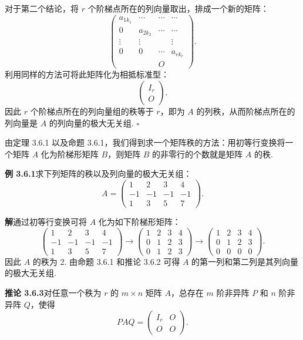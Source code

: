 \documentclass[UTF8, 12pt, fontset=fandol, oneside]{ctexart}
\begin{document}
对于第二个结论，将 $r$ 个阶梯点所在的列向量取出，排成一个新的矩阵：
\[
\left(\begin{array}{cccc}
a_{1k_1}&\cdots&\cdots&\cdots\\
0&a_{2k_2}&\cdots&\cdots\\
\vdots&\vdots&&\vdots\\
0&0&\cdots&a_{rk_r}\\
&&O&
\end{array}\right).
\]
利用同样的方法可将此矩阵化为相抵标准型：
\[
\left(\begin{array}{c}
I_r\\
O
\end{array}\right).
\]
因此 $r$ 个阶梯点所在的列向量组的秩等于 $r$，即为 $A$ 的列秩，从而阶梯点所在的列向量是 $A$ 的列向量的极大无关组. $\square$

由定理 3.6.1 以及命题 3.6.1，我们得到求一个矩阵秩的方法：用初等行变换将一个矩阵 $A$ 化为阶梯形矩阵 $B$，则矩阵 $B$ 的非零行的个数就是矩阵 $A$ 的秩.

\noindent\textbf{例 3.6.1}\quad 求下列矩阵的秩以及列向量的极大无关组：
\[
A=\left(\begin{array}{rrrr}
1&2&3&4\\
-1&-1&-1&-1\\
1&3&5&7
\end{array}\right).
\]

\noindent\textbf{解}\quad 通过初等行变换可将 $A$ 化为如下阶梯形矩阵：
\[
\left(\begin{array}{rrrr}
1&2&3&4\\
-1&-1&-1&-1\\
1&3&5&7
\end{array}\right)
\to
\left(\begin{array}{rrrr}
1&2&3&4\\
0&1&2&3\\
0&1&2&3
\end{array}\right)
\to
\left(\begin{array}{rrrr}
1&2&3&4\\
0&1&2&3\\
0&0&0&0
\end{array}\right).
\]
因此 $A$ 的秩为 2. 由命题 3.6.1 和推论 3.6.2 可得 $A$ 的第一列和第二列是其列向量的极大无关组.

\noindent\textbf{推论 3.6.3}\quad 对任意一个秩为 $r$ 的 $m\times n$ 矩阵 $A$，总存在 $m$ 阶非异阵 $P$ 和 $n$ 阶非异阵 $Q$，使得
\begin{equation}
PAQ=\left(\begin{array}{cc}
I_r&O\\
O&O
\end{array}\right).
\tag{3.6.1}
\end{equation}
\end{document}
